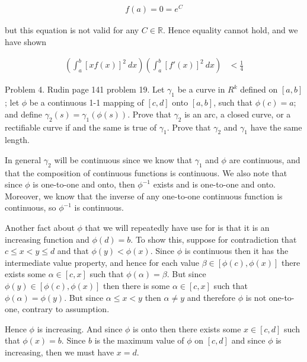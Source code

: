 \documentclass{article}
\begin{document}
  \begin{align*}
    f(a) = 0 = e^C
  \end{align*}

  but this equation is not valid for any $C\in \mathbb R$.  Hence equality cannot hold, and we have shown 

  \begin{align*}
    \left(\int_a^b [xf(x)]^2 \ dx \right)\left(\int_a^b [f'(x)]^2 \ dx\right) &< \frac 1 4
  \end{align*}

  \pagebreak

  {\Large \color{Sepia} Problem 4. Rudin page 141 problem 19. Let $\gamma_1$ be a curve in $R^k$ defined on $[a,b]$; let $\phi$ be a continuous 1-1 mapping of $[c,d]$ onto $[a,b]$, such that $\phi(c)=a$; and define $\gamma_2(s)=\gamma_1(\phi(s))$.  Prove that $\gamma_2$ is an arc, a closed curve, or a rectifiable curve if and the same is true of $\gamma_1$.  Prove that $\gamma_2$ and $\gamma_1$ have the same length.}

  \vspace{1cm}

  In general $\gamma_2$ will be continuous since we know that $\gamma_1$ and $\phi$ are continuous, and that the composition of continuous functions is continuous.  We also note that since $\phi$ is one-to-one and onto, then $\phi^{-1}$ exists and is one-to-one and onto.  Moreover, we know that the inverse of any one-to-one continuous function is continuous, so $\phi^{-1}$ is continuous.  

  Another fact about $\phi$ that we will repeatedly have use for is that it is an increasing function and $\phi(d)=b$.  To show this, suppose for contradiction that $c\leq x < y \leq d$ and that $\phi(y)<\phi(x)$. Since $\phi$ is continuous then it has the intermediate value property, and hence for each value $\beta \in [\phi(c),\phi(x)]$ there exists some $\alpha \in [c,x]$ such that $\phi(\alpha)=\beta$. But since $\phi(y)\in[\phi(c),\phi(x)]$ then there is some $\alpha\in[c,x]$ such that $\phi(\alpha)=\phi(y)$.  But since $\alpha\leq x < y$ then $\alpha\ne y$ and therefore $\phi$ is not one-to-one, contrary to assumption.  \lightning  
  
  Hence $\phi$ is increasing.  And since $\phi$ is onto then there exists some $x\in[c,d]$ such that $\phi(x)=b$.  Since $b$ is the maximum value of $\phi$ on $[c,d]$ and since $\phi$ is increasing, then we must have $x=d$.  

  \vspace{1cm}
\end{document}

